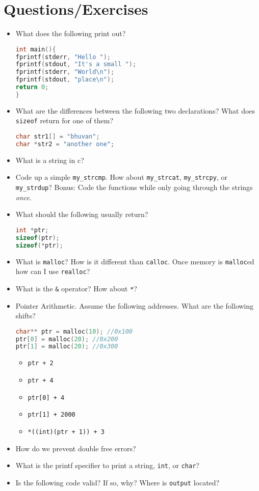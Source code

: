 \section{Questions/Exercises}

\begin{itemize}
\item
  What does the following print out?

\begin{lstlisting}[language=C]
int main(){
fprintf(stderr, "Hello ");
fprintf(stdout, "It's a small ");
fprintf(stderr, "World\n");
fprintf(stdout, "place\n");
return 0;
}
\end{lstlisting}
\item
  What are the differences between the following two declarations? What
  does \texttt{sizeof} return for one of them?

\begin{lstlisting}[language=C]
char str1[] = "bhuvan";
char *str2 = "another one";
\end{lstlisting}
\item
  What is a string in c?
\item
  Code up a simple \texttt{my\_strcmp}. How about \texttt{my\_strcat},
  \texttt{my\_strcpy}, or \texttt{my\_strdup}? Bonus: Code the functions
  while only going through the strings \emph{once}.
\item
  What should the following usually return?

\begin{lstlisting}[language=C]
int *ptr;
sizeof(ptr);
sizeof(*ptr);
\end{lstlisting}
\item
  What is \texttt{malloc}? How is it different than \texttt{calloc}.
  Once memory is \texttt{malloc}ed how can I use \texttt{realloc}?
\item
  What is the \texttt{\&} operator? How about \texttt{*}?
\item
  Pointer Arithmetic. Assume the following addresses. What are the
  following shifts?

\begin{lstlisting}[language=C]
char** ptr = malloc(10); //0x100
ptr[0] = malloc(20); //0x200
ptr[1] = malloc(20); //0x300
\end{lstlisting}

  \begin{itemize}
  \tightlist
  \item
    \texttt{ptr\ +\ 2}
  \item
    \texttt{ptr\ +\ 4}
  \item
    \texttt{ptr{[}0{]}\ +\ 4}
  \item
    \texttt{ptr{[}1{]}\ +\ 2000}
  \item
    \texttt{*((int)(ptr\ +\ 1))\ +\ 3}
  \end{itemize}
\item
  How do we prevent double free errors?
\item
  What is the printf specifier to print a string, \texttt{int}, or
  \texttt{char}?
\item
  Is the following code valid? If so, why? Where is \texttt{output}
  located?


\end{itemize}
